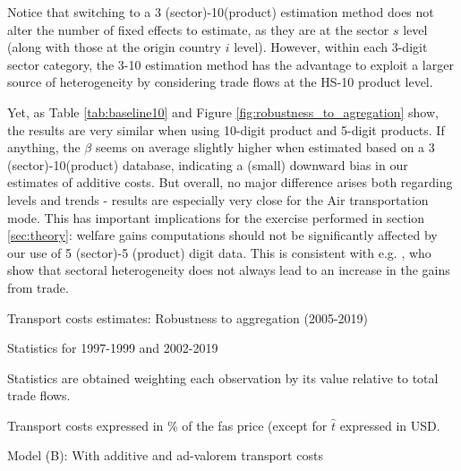 \documentclass[a4paper,11pt]{article}
\begin{document}
Notice that switching to a 3 (sector)-10(product) estimation method does not alter the number of fixed effects to estimate, as they are at the sector $s$ level (along with those at the origin country $i$ level). However, within each 3-digit sector category, the 3-10 estimation method has the advantage to exploit a larger source of heterogeneity by considering trade flows at the HS-10 product level.

Yet, as Table \ref{tab:baseline10} and 	Figure \ref{fig:robustness_to_agregation} show, the results are very similar when using 10-digit product and 5-digit products. If anything, the $\beta$ seems on average slightly higher when estimated based on a 3 (sector)-10(product) database, indicating a (small) downward bias in our estimates of additive costs. But overall, no major difference arises both regarding levels and trends - results are especially very close for the Air transportation mode. This has important implications for the exercise performed in section \ref{sec:theory}: welfare gains computations should not be significantly affected by our use of 5 (sector)-5 (product) digit data. This is consistent with e.g. \citet{Giri_et_al2021}, who show that sectoral heterogeneity does not always lead to an increase in the gains from trade.

\begin{table}[htbp]
	\centering
	\caption{Transport costs estimates: Robustness to aggregation (2005-2019)} \vspace{5mm} \label{tab:baseline10}
	
	
	\begin{tablenotes}
		\scriptsize
		\item Statistics for 1997-1999 and 2002-2019
		\item Statistics are obtained weighting each observation by its value relative to total trade flows.
        \item Transport costs expressed in \% of the fas price (except for $\widehat{t}$ expressed in USD.
		\item Model (B): With additive and ad-valorem transport costs
	\end{tablenotes}
\end{table}
\end{document}
